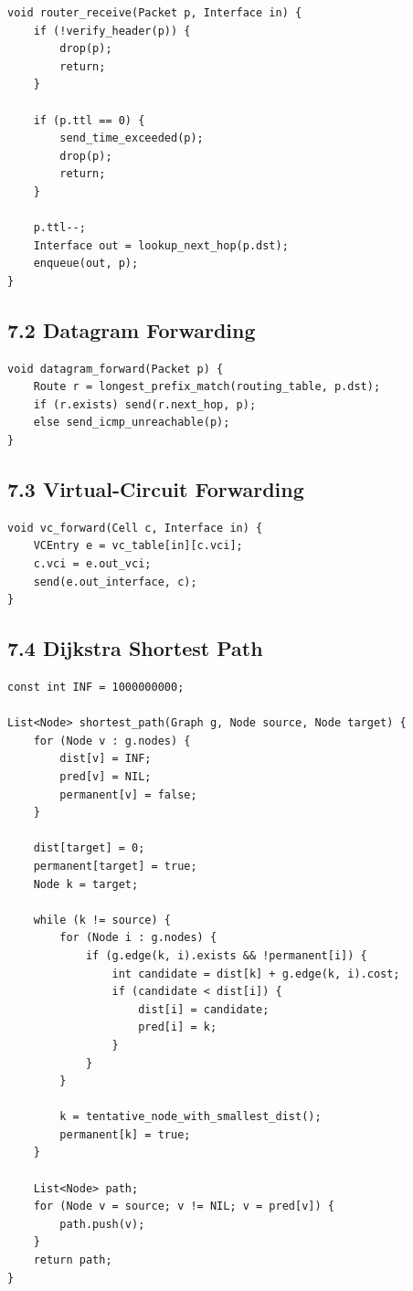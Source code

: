 \documentclass[11pt]{article}
\begin{document}
\begin{verbatim}
void router_receive(Packet p, Interface in) {
    if (!verify_header(p)) {
        drop(p);
        return;
    }

    if (p.ttl == 0) {
        send_time_exceeded(p);
        drop(p);
        return;
    }

    p.ttl--;
    Interface out = lookup_next_hop(p.dst);
    enqueue(out, p);
}
\end{verbatim}

\subsection{7.2 Datagram Forwarding}\label{datagram-forwarding}

\begin{verbatim}
void datagram_forward(Packet p) {
    Route r = longest_prefix_match(routing_table, p.dst);
    if (r.exists) send(r.next_hop, p);
    else send_icmp_unreachable(p);
}
\end{verbatim}

\subsection{7.3 Virtual-Circuit
Forwarding}\label{virtual-circuit-forwarding}

\begin{verbatim}
void vc_forward(Cell c, Interface in) {
    VCEntry e = vc_table[in][c.vci];
    c.vci = e.out_vci;
    send(e.out_interface, c);
}
\end{verbatim}

\subsection{7.4 Dijkstra Shortest Path}\label{dijkstra-shortest-path}

\begin{verbatim}
const int INF = 1000000000;

List<Node> shortest_path(Graph g, Node source, Node target) {
    for (Node v : g.nodes) {
        dist[v] = INF;
        pred[v] = NIL;
        permanent[v] = false;
    }

    dist[target] = 0;
    permanent[target] = true;
    Node k = target;

    while (k != source) {
        for (Node i : g.nodes) {
            if (g.edge(k, i).exists && !permanent[i]) {
                int candidate = dist[k] + g.edge(k, i).cost;
                if (candidate < dist[i]) {
                    dist[i] = candidate;
                    pred[i] = k;
                }
            }
        }

        k = tentative_node_with_smallest_dist();
        permanent[k] = true;
    }

    List<Node> path;
    for (Node v = source; v != NIL; v = pred[v]) {
        path.push(v);
    }
    return path;
}
\end{verbatim}
\end{document}
